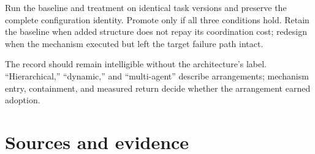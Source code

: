 Run the baseline and treatment on identical task versions and preserve the complete configuration identity. Promote only if all three conditions hold. Retain the baseline when added structure does not repay its coordination cost; redesign when the mechanism executed but left the target failure path intact.

The record should remain intelligible without the architecture's label. ``Hierarchical,'' ``dynamic,'' and ``multi-agent'' describe arrangements; mechanism entry, containment, and measured return decide whether the arrangement earned adoption.

\section*{Sources and evidence}

